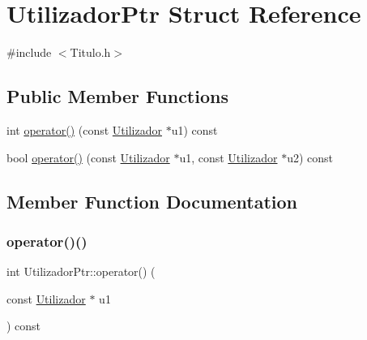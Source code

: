 \hypertarget{structUtilizadorPtr}{}\section{Utilizador\+Ptr Struct Reference}
\label{structUtilizadorPtr}


{\ttfamily \#include $<$Titulo.\+h$>$}

\subsection*{Public Member Functions}
\begin{DoxyCompactItemize}
\item 
int \hyperlink{structUtilizadorPtr_a51b14cea42ccf48388754bb5513f736f}{operator()} (const \hyperlink{classUtilizador}{Utilizador} $\ast$u1) const
\item 
bool \hyperlink{structUtilizadorPtr_afdc486a21619e0451d59dd4a9f244866}{operator()} (const \hyperlink{classUtilizador}{Utilizador} $\ast$u1, const \hyperlink{classUtilizador}{Utilizador} $\ast$u2) const
\end{DoxyCompactItemize}


\subsection{Member Function Documentation}
\mbox{\label{structUtilizadorPtr_a51b14cea42ccf48388754bb5513f736f}} 
\subsubsection{\texorpdfstring{operator()()}{operator()()}\hspace{0.1cm}{\footnotesize\ttfamily [1/2]}}
{\footnotesize\ttfamily int Utilizador\+Ptr\+::operator() (\begin{DoxyParamCaption}\item[{const \hyperlink{classUtilizador}{Utilizador} $\ast$}]{u1 }\end{DoxyParamCaption}) const\hspace{0.3cm}{\ttfamily [inline]}}


